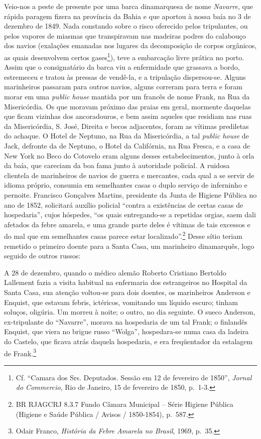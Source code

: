Veio-nos a peste de presente por uma barca dinamarquesa de nome
\emph{Navarre}, que rápida paragem fizera na província da Bahia e que
aportou à nossa baía no 3 de dezembro de 1849. Nada constando sobre o
risco oferecido pelos tripulantes, ou pelos vapores de miasmas que
transpiravam nas madeiras podres do calabouço dos navios (exalações
emanadas nos lugares da decomposição de corpos orgânicos, as quais
desenvolvem certos gases\footnote{Cf. ``Camara dos Srs. Deputados.
  Sessão em 12 de fevereiro de 1850'', \emph{Jornal do Commercio}, Rio
  de Janeiro, 15 de fevereiro de 1850, p.~1-3.}), teve a embarcação
livre prática no porto. Assim que o consignatário da barca viu a
enfermidade que grassava a bordo, estremeceu e tratou às pressas de
vendê-la, e a tripulação dispersou-se. Alguns marinheiros passaram para
outros navios, alguns correram para terra e foram morar em uma
\emph{public house} mantida por um francês de nome Frank, na Rua da
Misericórdia. Os que moravam próximo das praias em geral, mormente
daquelas que ficam vizinhas dos ancoradouros, e bem assim aqueles que
residiam nas ruas da Misericórdia, S. José, Direita e becos adjacentes,
foram as vítimas prediletas do achaque. O Hotel de Neptuno, na Rua da
Misericórdia, a tal \emph{public house} de Jack, defronte da de Neptuno,
o Hotel da Califórnia, na Rua Fresca, e a casa de New York no Beco do
Cotovelo eram alguns desses estabelecimentos, junto à orla da baía, que
careciam da boa fama junto à autoridade policial. A ruidosa clientela de
marinheiros de navios de guerra e mercantes, cada qual a se servir de
idioma próprio, consumia em semelhantes casas o duplo serviço de
inferninho e pernoite. Francisco Gonçalves Martins, presidente da Junta
de Higiene Pública no ano de 1852, solicitará auxílio policial ``contra
a existências de certas casas de hospedaria'', cujos hóspedes, ``os
quais entregando-se a repetidas orgias, saem dali afetados da febre
amarela, e uma grande parte deles é vítimas de tais excessos e do mal
que em semelhantes casas parece estar localizado''.\footnote{BR RJAGCRJ
  8.3.7 Fundo Câmara Municipal -- Série Higiene Pública (Higiene e Saúde
  Pública / Avisos / 1850-1854), p.~587.} Desse sítio teriam remetido o
primeiro doente para a Santa Casa, um marinheiro dinamarquês, logo
seguido de outros russos:

A 28 de dezembro, quando o médico alemão Roberto Cristiano Bertoldo
Lallement fazia a visita habitual na enfermaria dos estrangeiros no
Hospital da Santa Casa, sua atenção voltou-se para dois doentes, os
marinheiros Anderson e Enquist, que estavam febris, ictéricos, vomitando
um líquido escuro; tinham soluços, oligúria. Um morreu à noite; o outro,
no dia seguinte. O sueco Anderson, ex-tripulante do ``Navarre'', morava
na hospedaria de um tal Frank; o finlandês Enquist, que viera no brigue
russo ``Wolga'', hospedara-se numa casa da ladeira do Castelo, que
ficava atrás daquela hospedaria, e era freqüentador da estalagem de
Frank.\footnote{Odair Franco, \emph{História da Febre Amarela no
  Brasil}, 1969, p.~35.}

